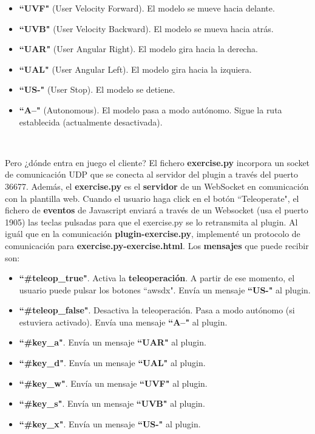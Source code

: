 \begin{itemize}
	\item \textbf{``UVF"} (User Velocity Forward). El modelo se mueve hacia delante.
	\item \textbf{``UVB"} (User Velocity Backward). El modelo se mueva hacia atrás.
	\item \textbf{``UAR"} (User Angular Right). El modelo gira hacia la derecha.
	\item \textbf{``UAL"} (User Angular Left). El modelo gira hacia la izquiera.
	\item \textbf{``US-"} (User Stop). El modelo se detiene.
	\item \textbf{``A--"} (Autonomous). El modelo pasa a modo autónomo. Sigue la ruta establecida (actualmente desactivada).
\end{itemize}\

Pero ¿dónde entra en juego el cliente? El fichero \textbf{exercise.py} incorpora un socket de comunicación UDP que se conecta al servidor del plugin a través del puerto 36677. Además, el \textbf{exercise.py} es el \textbf{servidor} de un WebSocket en comunicación con la plantilla web. Cuando el usuario haga click en el botón ``Teleoperate", el fichero de \textbf{eventos} de Javascript enviará a través de un Websocket (usa el puerto 1905) las teclas pulsadas para que el exercise.py se lo retransmita al plugin. Al iguál que en la comunicación \textbf{plugin-exercise.py}, implementé un protocolo de comunicación para \textbf{exercise.py-exercise.html}. Los \textbf{mensajes} que puede recibir son:\\

\begin{itemize}
	\item \textbf{``\#teleop\_true"}. Activa la \textbf{teleoperación}. A partir de ese momento, el usuario puede pulsar los botones ``awsdx". Envía un mensaje \textbf{``US-"} al plugin.
	\item \textbf{``\#teleop\_false"}. Desactiva la teleoperación. Pasa a modo autónomo (si estuviera activado). Envía una mensaje \textbf{``A--"} al plugin.
	\item \textbf{``\#key\_a"}. Envía un mensaje \textbf{``UAR"} al plugin.
	\item \textbf{``\#key\_d"}. Envía un mensaje \textbf{``UAL"} al plugin.
	\item \textbf{``\#key\_w"}. Envía un mensaje \textbf{``UVF"} al plugin.
	\item \textbf{``\#key\_s"}. Envía un mensaje \textbf{``UVB"} al plugin.
	\item \textbf{``\#key\_x"}. Envía un mensaje \textbf{``US-"} al plugin.
\end{itemize}\

